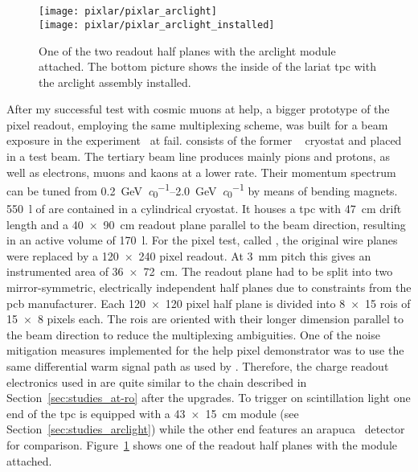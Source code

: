 \section{\pixlar{}}
\label{sec:ac_pixlar}

\begin{figure}[tbp]
	\centering
	\texttt{[image: pixlar/pixlar\_arclight]}\\
	\texttt{[image: pixlar/pixlar\_arclight\_installed]}
	\caption[\pixlar{} half plane with attached  module]{%
		One of the two \pixlar{} readout half planes with the \acrshort{arclight} module attached.
		The bottom picture shows the inside of the \acrshort{lariat} \acrshort{tpc} with the \pixlar{} \acrshort{arclight} assembly installed.
	}
	\label{fig:pixlar_arclight}
\end{figure}

After my successful test with cosmic muons at \gls{help}, a bigger prototype of the pixel readout, employing the same multiplexing scheme, was built for a beam exposure in the \lariat{} experiment~\cite{lariat} at \gls{fail}.
\lariat{} consists of the former \argoneut{}~\cite{argoneut} cryostat and \lartpc{} placed in a test beam.
The tertiary beam line produces mainly pions and protons, as well as electrons, muons and kaons at a lower rate.
Their momentum spectrum can be tuned from \SIrange{0.2}{2.0}{\giga\electronvolt\per\clight} by means of bending magnets.
\SI{550}{\litre} of \lar{} are contained in a cylindrical cryostat.
It houses a \gls{tpc} with \SI{47}{\centi\metre} drift length and a \SI{40 x 90}{\centi\metre} readout plane parallel to the beam direction, resulting in an active volume of \SI{170}{\litre}.
For the pixel test, called \pixlar{}, the original wire planes were replaced by a \num{120 x 240} pixel readout.
At \SI{3}{\milli\metre} pitch this gives an instrumented area of \SI{36 x 72}{\centi\metre}.
The readout plane had to be split into two mirror-symmetric, electrically independent half planes due to constraints from the \gls{pcb} manufacturer.
Each \num{120 x 120} pixel half plane is divided into \num{8 x 15} \glspl{roi} of \num{15 x 8} pixels each.
The \glspl{roi} are oriented with their longer dimension parallel to the beam direction to reduce the multiplexing ambiguities.
One of the noise mitigation measures implemented for the \gls{help} pixel demonstrator was to use the same differential warm signal path as used by \lariat{}.
Therefore, the charge readout electronics used in \pixlar{} are quite similar to the \AT{} chain described in Section~\ref{sec:studies_at-ro} after the upgrades.
To trigger on scintillation light one end of the \gls{tpc} is equipped with a \SI{43 x 15}{\centi\metre} \AL{} module (see Section~\ref{sec:studies_arclight}) while the other end features an \gls{arapuca}~\cite{arapuca} detector for comparison.
Figure~\ref{fig:pixlar_arclight} shows one of the readout half planes with the \AL{} module attached.

